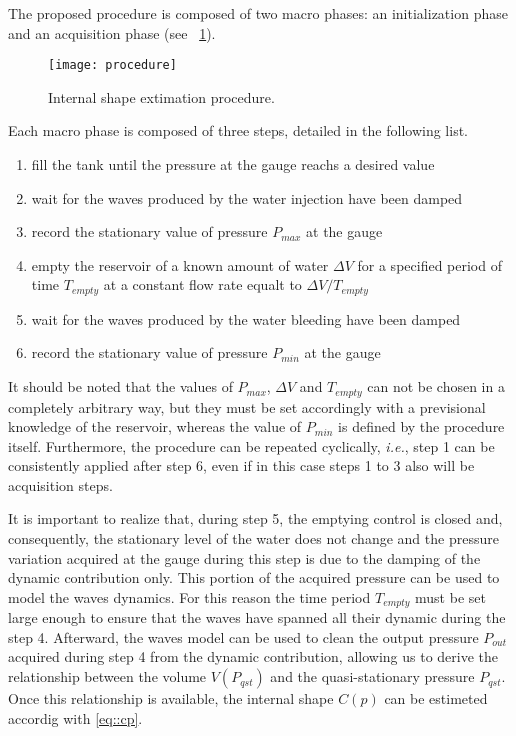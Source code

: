 \documentclass[journal]{IEEEtran}
\begin{document}
The proposed procedure is composed of two macro phases: an initialization phase and an acquisition phase (see \figurename~\ref{fig::procedure}). 
\begin{figure}[!htbp]
	\centering
		\texttt{[image: procedure]}
	\caption{Internal shape extimation procedure.}
	\label{fig::procedure}
\end{figure}
Each macro phase is composed of three steps, detailed in the following list.
\begin{enumerate}
\item[step 1] fill the tank until the pressure at the gauge reachs a desired value
\item[step 2] wait for the waves produced by the water injection have been damped
\item[step 3] record the stationary value of pressure $P_{max}$ at the gauge
\item[step 4] empty the reservoir of a known amount of water $\Delta V$  for a specified period of time $T_{empty}$ at a constant flow rate equalt to $\Delta V/T_{empty}$
\item[step 5] wait for the waves produced by the water bleeding have been damped
\item[step 6] record the stationary value of pressure $P_{min}$ at the gauge
\end{enumerate}
It should be noted that the values of $P_{max}$, $\Delta V$ and $T_{empty}$ can not be chosen in a completely arbitrary way, but they must be set accordingly with a previsional knowledge of the reservoir, whereas the value of $P_{min}$ is defined by the procedure itself. 
Furthermore, the procedure can be repeated cyclically, \textit{i.e.}, step 1 can be consistently applied after step 6, even if in this case steps 1 to 3 also will be acquisition steps.

It is important to realize that, during step 5, the emptying control is closed and, consequently, the stationary level of the water does not change and the pressure variation acquired at the gauge during this step is due to the damping of the dynamic contribution only. 
This portion of the acquired pressure can be used to model the waves dynamics. For this reason the time period $T_{empty}$ must be set large enough to ensure that the waves have spanned all their dynamic during the step 4.
Afterward, the waves model can be used to clean the output pressure $P_{out}$ acquired during step 4 from the dynamic contribution, allowing us to derive the relationship between the volume $V(P_{qst})$ and the quasi-stationary pressure $P_{qst}$.
Once this relationship is available, the internal shape $C(p)$ can be estimeted accordig with \eqref{eq::cp}.
\end{document}
